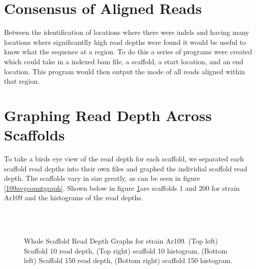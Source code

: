 \documentclass[12pt]{article}
\begin{document}
\section{Consensus of Aligned Reads}
	Between the identification of locations where there were indels and having many locations where significantlly high read depths were found it would be useful to know what the sequence at a region. To do this a series of programs were created which could take in a indexed bam file, a scaffold, a start location, and an end location. This program would then output the mode of all reads aligned within that region. 


%
%
\section{Graphing Read Depth Across Scaffolds}
	To take a birds eye view of the read depth for each scaffold, we separated each scaffold read depths into their own files and graphed the individial scaffold read depth. The scaffolds vary in size greatly, as can be seen in figure \ref{109avgcountgraph}. Shown below in figure \ref{wholescaffandhisto}are scaffolds 1 and 200 for strain Ar109 and the histograms of the read depths.

\begin{figure}[H]
	\begin{centering}

		\\
		\\
		\begin{singlespace}
			\vspace{-0.5cm}
			\caption[Whole Scaffold Read Depth Graphs.]{Whole Scaffold Read Depth Graphs for strain Ar109. (Top left) Scaffold 10 read depth, (Top right) scaffold 10 histogram, (Bottom left) Scaffold 150 read depth, (Bottom right) scaffold 150 histogram.}\label{wholescaffandhisto}
		\end{singlespace}
	\end{centering}
\end{figure}
\end{document}
